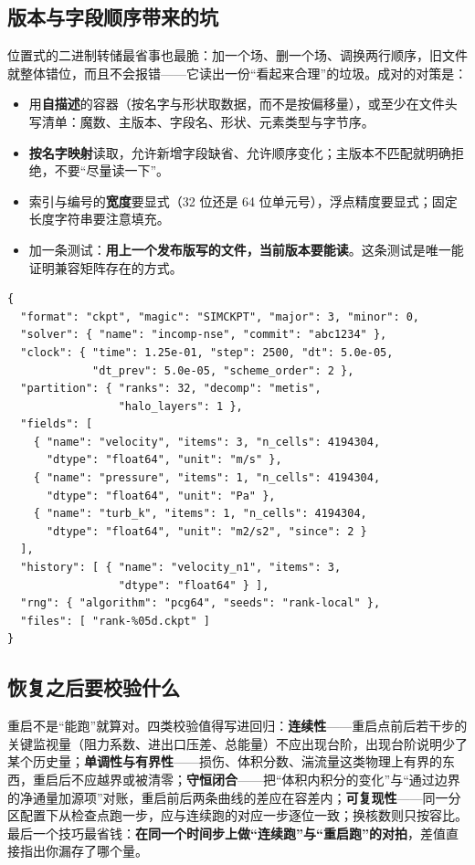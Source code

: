 \documentclass[12pt,a4paper,fontset=fandol]{ctexbook}
\begin{document}
\subsection*{版本与字段顺序带来的坑}

位置式的二进制转储最省事也最脆：加一个场、删一个场、调换两行顺序，旧文件就整体错位，而且不会报错——它读出一份``看起来合理''的垃圾。成对的对策是：

\begin{itemize}
\item 用\textbf{自描述}的容器（按名字与形状取数据，而不是按偏移量），或至少在文件头写清单：魔数、主版本、字段名、形状、元素类型与字节序。
\item \textbf{按名字映射}读取，允许新增字段缺省、允许顺序变化；主版本不匹配就明确拒绝，不要``尽量读一下''。
\item 索引与编号的\textbf{宽度}要显式（32 位还是 64 位单元号），浮点精度要显式；固定长度字符串要注意填充。
\item 加一条测试：\textbf{用上一个发布版写的文件，当前版本要能读}。这条测试是唯一能证明兼容矩阵存在的方式。
\end{itemize}

\begin{lstlisting}[style=jsonstyle,
  caption={检查点清单（manifest）骨架：让读者按名字取字段并校验形状},
  label={lst:ch08-ckpt-manifest}]
{
  "format": "ckpt", "magic": "SIMCKPT", "major": 3, "minor": 0,
  "solver": { "name": "incomp-nse", "commit": "abc1234" },
  "clock": { "time": 1.25e-01, "step": 2500, "dt": 5.0e-05,
             "dt_prev": 5.0e-05, "scheme_order": 2 },
  "partition": { "ranks": 32, "decomp": "metis",
                 "halo_layers": 1 },
  "fields": [
    { "name": "velocity", "items": 3, "n_cells": 4194304,
      "dtype": "float64", "unit": "m/s" },
    { "name": "pressure", "items": 1, "n_cells": 4194304,
      "dtype": "float64", "unit": "Pa" },
    { "name": "turb_k", "items": 1, "n_cells": 4194304,
      "dtype": "float64", "unit": "m2/s2", "since": 2 }
  ],
  "history": [ { "name": "velocity_n1", "items": 3,
                 "dtype": "float64" } ],
  "rng": { "algorithm": "pcg64", "seeds": "rank-local" },
  "files": [ "rank-%05d.ckpt" ]
}
\end{lstlisting}

\subsection*{恢复之后要校验什么}

重启不是``能跑''就算对。四类校验值得写进回归：\textbf{连续性}——重启点前后若干步的关键监视量（阻力系数、进出口压差、总能量）不应出现台阶，出现台阶说明少了某个历史量；\textbf{单调性与有界性}——损伤、体积分数、湍流量这类物理上有界的东西，重启后不应越界或被清零；\textbf{守恒闭合}——把``体积内积分的变化''与``通过边界的净通量加源项''对账，重启前后两条曲线的差应在容差内；\textbf{可复现性}——同一分区配置下从检查点跑一步，应与连续跑的对应一步逐位一致；换核数则只按容比。最后一个技巧最省钱：\textbf{在同一个时间步上做``连续跑''与``重启跑''的对拍}，差值直接指出你漏存了哪个量。
\end{document}
